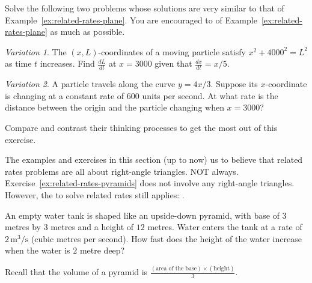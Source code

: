 \documentclass[../main.tex]{subfiles}
\begin{document}
\begin{exercise} \label{ex:related-rates-plane-variations}
  Solve the following two problems whose solutions are very similar to that of Example~\ref{ex:related-rates-plane}. You are encouraged to  of Example~\ref{ex:related-rates-plane} as much as possible.

  \begin{minipage}[t]{0.49\textwidth}
    \textit{Variation 1}.
    The \((x, L)\)-coordinates of a moving particle satisfy \(x^{2} + 4000^{2} = L^{2}\) as time \(t\) increases. Find \(\frac{dL}{dt}\) at \(x = 3000\) given that \(\frac{dx}{dt} = x/5\).
  \end{minipage}
  \hfill\vline\hfill
  \begin{minipage}[t]{0.49\textwidth}
    \textit{Variation 2}. 
    A particle travels along the curve \(y = 4x/3\).  Suppose its \(x\)-coordinate is changing at a constant rate of \(600\) units per second. At what rate is the distance between the origin and the particle changing when \(x = 3000\)?
  \end{minipage}

  \faStar{} Compare and contrast their thinking processes to get the most out of this exercise.

\end{exercise}
\clearpage

\faExclamationTriangle{} The examples and exercises in this section (up to now)  us to believe that related rates problems are all about right-angle triangles. NOT always. Exercise~\ref{ex:related-rates-pyramids} does not involve any right-angle triangles. However, the  to solve related rates still applies: .

\begin{example} \label{ex:related-rates-pyramids}
  An empty water tank is shaped like an upside-down pyramid, with base of \(3\) metres by \(3\) metres and a height of \(12\) metres. Water enters the tank at a rate of \(2\,\text{m}^{3}/\text{s}\) (cubic metres per second). How fast does the height of the water increase when the water is \(2\) metre deep?

  Recall that the volume of a pyramid is \(\frac{(\text{area of the base}) \times (\text{height})}{3}\).

\end{example}
\end{document}
